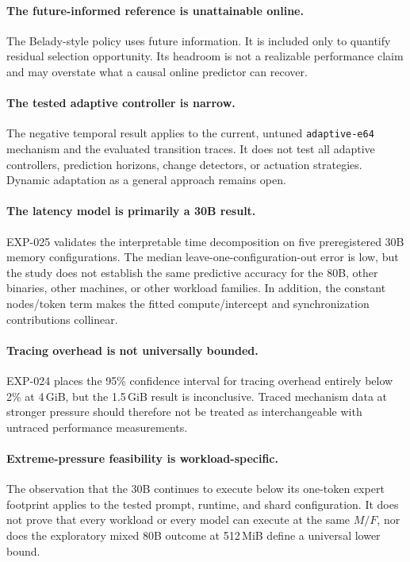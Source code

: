 \paragraph{The future-informed reference is unattainable online.}
The Belady-style policy uses future information. It is included only to quantify residual selection opportunity. Its headroom is not a realizable performance claim and may overstate what a causal online predictor can recover.

\paragraph{The tested adaptive controller is narrow.}
The negative temporal result applies to the current, untuned \texttt{adaptive-e64} mechanism and the evaluated transition traces. It does not test all adaptive controllers, prediction horizons, change detectors, or actuation strategies. Dynamic adaptation as a general approach remains open.

\paragraph{The latency model is primarily a 30B result.}
EXP-025 validates the interpretable time decomposition on five preregistered 30B memory configurations. The median leave-one-configuration-out error is low, but the study does not establish the same predictive accuracy for the 80B, other binaries, other machines, or other workload families. In addition, the constant nodes/token term makes the fitted compute/intercept and synchronization contributions collinear.

\paragraph{Tracing overhead is not universally bounded.}
EXP-024 places the 95\% confidence interval for tracing overhead entirely below 2\% at 4\,GiB, but the 1.5\,GiB result is inconclusive. Traced mechanism data at stronger pressure should therefore not be treated as interchangeable with untraced performance measurements.

\paragraph{Extreme-pressure feasibility is workload-specific.}
The observation that the 30B continues to execute below its one-token expert footprint applies to the tested prompt, runtime, and shard configuration. It does not prove that every workload or every model can execute at the same $M/F$, nor does the exploratory mixed 80B outcome at 512\,MiB define a universal lower bound.

